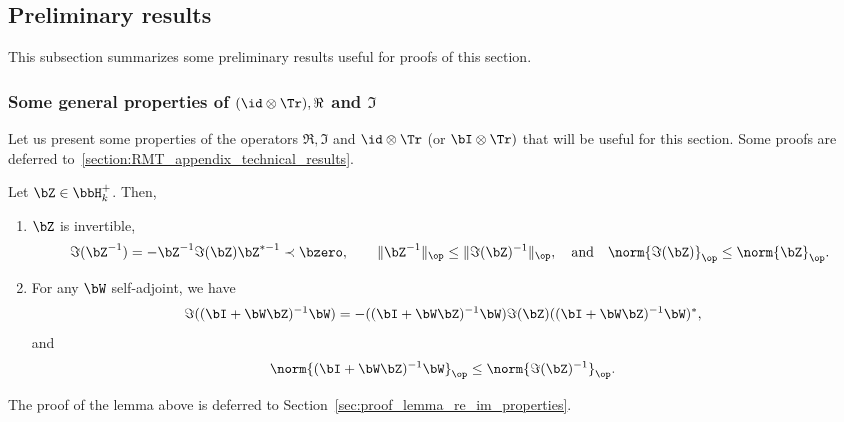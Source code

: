 \subsection{Preliminary results}
This subsection summarizes some preliminary results useful for proofs of this section. 
\subsubsection{Some general properties of  \texorpdfstring{${(\id \otimes \Tr)},\Re$ and $\Im$}{(I x Tr),Re and Im}}


Let us present some properties of the operators $\Re,\Im$ and $\id \otimes \Tr$ (or $\bI\otimes \Tr)$ that will be useful for this section. Some proofs are deferred to~\ref{section:RMT_appendix_technical_results}.
\begin{lemma}
\label{lemma:re_im_properties}
Let $\bZ \in\bbH^+_k$. Then,
\begin{enumerate}
\item 
$\bZ$ is invertible,
\begin{equation*}
    \Im(\bZ^{-1}) = - \bZ^{-1} \Im(\bZ) \bZ^{*-1}\prec\bzero, \quad\quad
\|\bZ^{-1}\|_\op \le \|\Im(\bZ)^{-1}\|_\op, \quad\textrm{and}\quad
\norm{\Im(\bZ)}_\op \le \norm{\bZ}_\op.
\end{equation*}

\item For any $\bW$ self-adjoint, we have
\begin{align*}
    \Im((\bI+\bW \bZ)^{-1}\bW ) &= -((\bI + \bW \bZ)^{-1}\bW)\Im(\bZ)((\bI + \bW \bZ)^{-1}\bW)^*,
\end{align*}
and
\begin{align*}
   \norm{(\bI + \bW\bZ)^{-1}\bW}_\op &\le \norm{\Im(\bZ)^{-1}}_\op.
\end{align*}
\end{enumerate}
\end{lemma}
The proof of the lemma above is deferred to Section~\ref{sec:proof_lemma_re_im_properties}.
